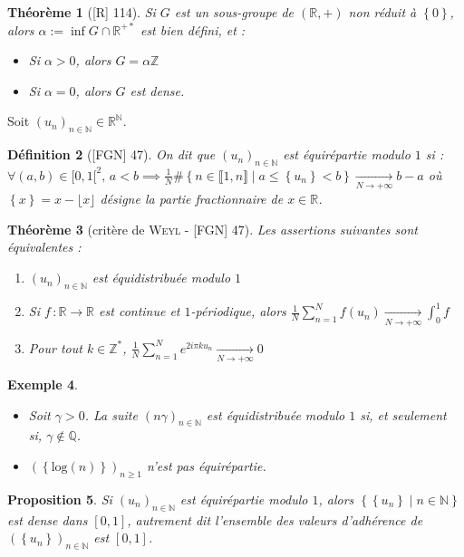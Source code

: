 \documentclass[10pt, a4paper, parskip=full, twoside, twocolumn]{report}
\newtheorem{definition}{Définition}
\newtheorem{theorem}[definition]{Théorème}
\newtheorem{proposition}[definition]{Proposition}
\newtheorem{example}[definition]{Exemple}
\newcommand{\IN}{\mathbb{N}}
\newcommand{\IZ}{\mathbb{Z}}
\newcommand{\IQ}{\mathbb{Q}}
\newcommand{\IR}{\mathbb{R}}
\begin{document}
\begin{theorem}[\textnormal{[R] 114}]
	Si $G$ est un sous-groupe de $(\IR,+)$ 
	non réduit à $\left\{0 \right\}$, alors $\alpha := \inf G\cap \IR^{+*}$ est bien défini, et :
	\begin{itemize}
		\item Si $\alpha > 0$, alors $G = \alpha\IZ$
		\item Si $\alpha = 0$, alors $G$ est dense.
	\end{itemize}
\end{theorem}


\textcolor{paragraphtext}{Soit $\left(u_n\right)_{n\in\IN}\in\IR^{\IN}$.}
\begin{definition}[\textnormal{[FGN] 47}]
	On dit que $\left(u_n\right)_{n\in\IN}$ est \emph{équirépartie modulo $1$} si :
	$\forall (a,b)\in[0,1[^2,\, a<b\implies \frac{1}{N}\#\left\{n\in \llbracket 1,n \rrbracket \mid a\leq \left\{u_n\right\} < b\right\}\xrightarrow[N\to +\infty]{} b-a$
	où $\left\{x\right\} = x - \lfloor x \rfloor$ désigne la partie fractionnaire de $x\in\IR$.
\end{definition}

\begin{theorem}[critère de \textsc{Weyl} - \textnormal{[FGN] 47}]
	\label{223dev2}
	Les assertions suivantes sont équivalentes :
	\begin{enumerate}
		\item $\left(u_n\right)_{n\in\IN}$ est équidistribuée modulo $1$
		\item Si $f\,\colon \IR\to \IR$ est continue et $1$-périodique, alors $\frac{1}{N}\sum_{n=1}^{N}f(u_n)\xrightarrow[N\to +\infty]{} \int_{0}^{1} f$
		\item Pour tout $k\in\IZ^*$, $\frac{1}{N}\sum_{n=1}^{N} e^{2i\pi ku_n}\xrightarrow[N\to +\infty]{} 0$
	\end{enumerate}
\end{theorem}

\begin{example}
	\begin{itemize}
		\item Soit $\gamma > 0$. La suite $\left(n\gamma\right)_{n\in\IN}$ est équidistribuée modulo $1$ si, et seulement si, $\gamma\notin \IQ$.
		\item $\left(\left\{\text{log}(n)\right\}\right)_{n\geq 1}$ n'est pas équirépartie.
	\end{itemize}
\end{example}

\begin{proposition}
	Si $\left(u_n\right)_{n\in\IN}$ est équirépartie modulo $1$, alors $\left\{\left\{u_n\right\} \mid n\in \IN\right\}$ est dense dans $[0,1]$, autrement dit l'ensemble des valeurs d'adhérence de $\left(\left\{u_n\right\}\right)_{n\in\IN}$ est $[0,1]$.
\end{proposition}
\end{document}
